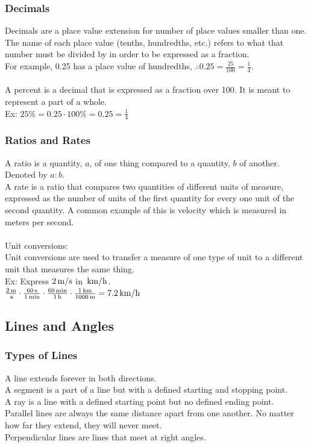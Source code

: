 \documentclass[11pt, fleqn]{article}
\begin{document}
\subsubsection{Decimals}
Decimals are a place value extension for number of place values smaller than one.\\
The name of each place value (tenths, hundredths, etc.) refers to what that number must be divided by in order to be expressed as a fraction.\\
For example, 0.25 has a place value of hundredths, $\therefore 0.25=\frac{25}{100}=\frac{1}{4}$.\\
\\
A percent is a decimal that is expressed as a fraction over 100. It is meant to represent a part of a whole.\\
Ex: $25\%=0.25\cdot 100\%=0.25=\frac{1}{4}$\\

\subsubsection{Ratios and Rates}
A ratio is a quantity, $a$, of one thing compared to a quantity, $b$ of another. Denoted by $a:b$.\\
A rate is a ratio that compares two quantities of different units of measure, expressed as the number of units of the first quantity for every one unit of the second quantity. A common example of this is velocity which is measured in meters per second.\\
\\
Unit conversions:\\
Unit conversions are used to transfer a measure of one type of unit to a different unit that measures the same thing.\\
Ex: Express $2\,\mathrm{m/s}$ in $\,\mathrm{km/h}$.\\
$\frac{2\,\mathrm{m}}{\,\mathrm{s}}\cdot\frac{60\,\mathrm{s}}{1\,\mathrm{min}}\cdot\frac{60\,\mathrm{min}}{1\,\mathrm{h}}\cdot\frac{1\,\mathrm{km}}{1000\,\mathrm{m}}=7.2\,\mathrm{km/h}$









\subsection{Lines and Angles}

\subsubsection{Types of Lines}
A line extends forever in both directions.\\
A segment is a part of a line but with a defined starting and stopping point.\\
A ray is a line with a defined starting point but no defined ending point.\\
Parallel lines are always the same distance apart from one another. No matter how far they extend, they will never meet.\\
Perpendicular lines are lines that meet at right angles.
\end{document}

